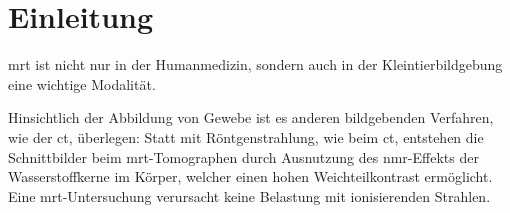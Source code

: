 \chapter{Einleitung}

\gls{mrt} ist nicht nur in der Humanmedizin, sondern auch in der Kleintierbildgebung eine wichtige Modalität.

 Hinsichtlich der Abbildung von Gewebe ist es anderen bildgebenden Verfahren, wie der \gls{ct}, überlegen: Statt mit Röntgenstrahlung, wie beim \gls{ct}, entstehen die Schnittbilder beim \gls{mrt}-Tomographen durch Ausnutzung des \gls{nmr}-Effekts der Wasserstoffkerne im Körper, welcher einen hohen Weichteilkontrast ermöglicht. Eine \gls{mrt}-Untersuchung verursacht keine Belastung mit ionisierenden Strahlen.
